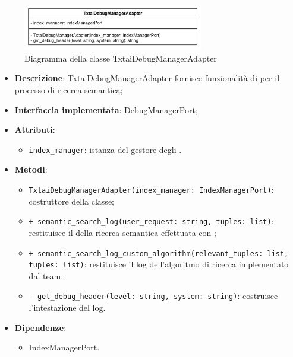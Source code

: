  \label{TxtaiDebugManagerAdapter}
\begin{figure}[H]
    \centering
    \includegraphics[width=0.7\textwidth]{assets/Backend/txtai_debug_manager_adapter.png}
    \caption{Diagramma della classe TxtaiDebugManagerAdapter}
  \end{figure}
\begin{itemize}
    \item \textbf{Descrizione}: TxtaiDebugManagerAdapter fornisce funzionalità di  per il processo di ricerca semantica;
    \item \textbf{Interfaccia implementata}: \hyperref[DebugManagerPort]{DebugManagerPort};
    \item \textbf{Attributi}:
    \begin{itemize}
        \item \texttt{index\_manager}: istanza del gestore degli .
    \end{itemize}
    \item \textbf{Metodi}:
    \begin{itemize}
        \item \texttt{TxtaiDebugManagerAdapter(index\_manager: IndexManagerPort)}: costruttore della classe;
        \item \texttt{+ semantic\_search\_log(user\_request: string, tuples: list)}: restituisce il  della ricerca semantica effettuata con ;
        \item \texttt{+ semantic\_search\_log\_custom\_algorithm(relevant\_tuples: list, tuples: list)}: restituisce il log dell'algoritmo di ricerca implementato dal team.
        \item \texttt{- get\_debug\_header(level: string, system: string)}: costruisce l'intestazione del log.
    \end{itemize}
    \item \textbf{Dipendenze}:
    \begin{itemize}
        \item IndexManagerPort.
    \end{itemize}
\end{itemize} 

